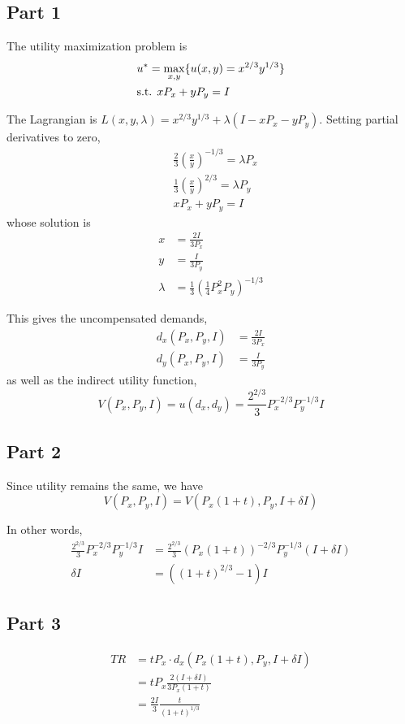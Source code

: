 \documentclass{article}
\begin{document}
\subsection{Part 1}
The utility maximization problem is
\begin{align*}
&u^*=\max_{x,y}\{u(x,y)=x^{2/3}y^{1/3}\}\\
&\textup{s.t. }xP_x+yP_y=I
\end{align*}

The Lagrangian is $L(x,y,\lambda)=x^{2/3}y^{1/3}+\lambda(I-xP_x-yP_y)$. Setting partial derivatives to zero,
\begin{align*}
&\frac{2}{3}\left(\frac{x}{y}\right)^{-1/3}=\lambda P_x\\
&\frac{1}{3}\left(\frac{x}{y}\right)^{2/3}=\lambda P_y\\
&xP_x+yP_y=I
\end{align*}
whose solution is
\begin{align*}
x&=\frac{2I}{3P_x}\\
y&=\frac{I}{3P_y}\\
\lambda&=\frac{1}{3}\left(\frac{1}{4}P_x^2P_y\right)^{-1/3}
\end{align*}

This gives the uncompensated demands,
\begin{align*}
d_x(P_x,P_y,I)&=\frac{2I}{3P_x}\\
d_y(P_x,P_y,I)&=\frac{I}{3P_y}
\end{align*}
as well as the indirect utility function,
\begin{equation*}
V(P_x,P_y,I)=u(d_x,d_y)=\frac{2^{2/3}}{3}P_x^{-2/3}P_y^{-1/3}I
\end{equation*}

\subsection{Part 2}
Since utility remains the same, we have
\begin{equation*}
V(P_x,P_y,I)=V(P_x(1+t),P_y,I+\delta I)
\end{equation*}

In other words,
\begin{align*}
\frac{2^{2/3}}{3}P_x^{-2/3}P_y^{-1/3}I&=\frac{2^{2/3}}{3}(P_x(1+t))^{-2/3}P_y^{-1/3}(I+\delta I)\\
\delta I&=\left((1+t)^{2/3}-1\right)I
\end{align*}

\subsection{Part 3}
\begin{align*}
TR&=tP_x\cdot d_x(P_x(1+t),P_y,I+\delta I)\\
&=tP_x\frac{2(I+\delta I)}{3P_x(1+t)}\\
&=\frac{2I}{3}\frac{t}{(1+t)^{1/3}}
\end{align*}
\end{document}
